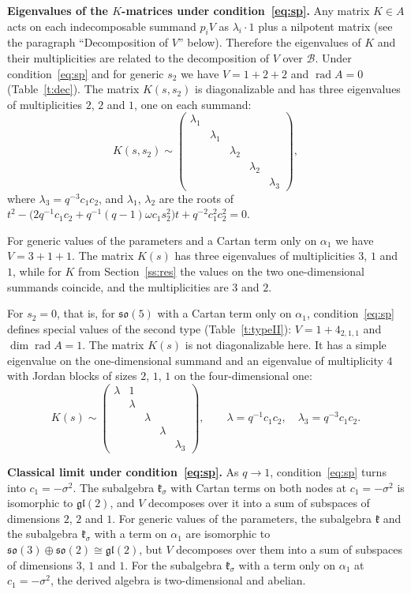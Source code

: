 \documentclass[12pt,a4paper]{article}
\newcommand{\kk}{\mathfrak{k}}
\newcommand{\so}{\mathfrak{so}}
\begin{document}
\textbf{Eigenvalues of the $K$-matrices under condition~\eqref{eq:sp}.} Any matrix $K\in A$ acts on each
indecomposable summand $p_iV$ as $\lambda_i\cdot1$ plus a nilpotent matrix (see the paragraph ``Decomposition of $V$'' below).
Therefore the eigenvalues of $K$ and their multiplicities are related to the decomposition of $V$ over $\mathcal B$. Under condition~\eqref{eq:sp} and
for generic $s_2$ we have $V=1+2+2$ and $\operatorname{rad}A=0$ (Table~\ref{t:dec}). The matrix $K(s,s_2)$ is diagonalizable and
has three eigenvalues of multiplicities $2$, $2$ and $1$, one on each summand:
\[
K(s,s_2)\sim\begin{pmatrix}
\lambda_1&&&&\\ &\lambda_1&&&\\ &&\lambda_2&&\\ &&&\lambda_2&\\ &&&&\lambda_3
\end{pmatrix},
\]
where $\lambda_3=q^{-3}c_1c_2$, and $\lambda_1$, $\lambda_2$ are the roots of $t^2-\bigl(2q^{-1}c_1c_2+q^{-1}(q-1)\omega c_1s_2^2\bigr)t+q^{-2}c_1^2c_2^2=0$.

 For generic values of the parameters
and a Cartan term only on $\alpha_1$ we have $V=3+1+1$. The matrix $K(s)$ has three eigenvalues of multiplicities $3$, $1$ and $1$, while for $K$
from Section~\ref{ss:res} the values on the two one-dimensional summands coincide, and the multiplicities are $3$ and $2$.

For $s_2=0$, that is, for $\so(5)$ with a Cartan term only on $\alpha_1$, condition~\eqref{eq:sp} defines special
values of the second type (Table~\ref{t:typeII}): $V=1+4_{2,1,1}$ and $\dim\operatorname{rad}A=1$. The matrix $K(s)$ is not
diagonalizable here. It has a simple eigenvalue on the one-dimensional summand and an eigenvalue of multiplicity $4$ with
Jordan blocks of sizes $2$, $1$, $1$ on the four-dimensional one:
\[
K(s)\sim\begin{pmatrix}
\lambda&1&&&\\ &\lambda&&&\\ &&\lambda&&\\ &&&\lambda&\\ &&&&\lambda_3
\end{pmatrix},\qquad \lambda=q^{-1}c_1c_2,\quad \lambda_3=q^{-3}c_1c_2 .
\]

\textbf{Classical limit under condition~\eqref{eq:sp}.} As $q\to1$, condition~\eqref{eq:sp} turns into $c_1=-\sigma^2$.
The subalgebra $\kk_\sigma$ with Cartan terms on both nodes at $c_1=-\sigma^2$ is isomorphic to $\mathfrak{gl}(2)$, and $V$ decomposes
over it into a sum of subspaces of dimensions $2$, $2$ and $1$. For generic values of the parameters, the subalgebra $\kk$ and the subalgebra
$\kk_\sigma$ with a term on $\alpha_1$ are isomorphic to $\so(3)\oplus\so(2)\cong\mathfrak{gl}(2)$, but $V$ decomposes over them
into a sum of subspaces of dimensions $3$, $1$ and $1$. For the subalgebra $\kk_\sigma$ with a term only on $\alpha_1$ at
$c_1=-\sigma^2$, the derived algebra is two-dimensional and abelian.
\end{document}
